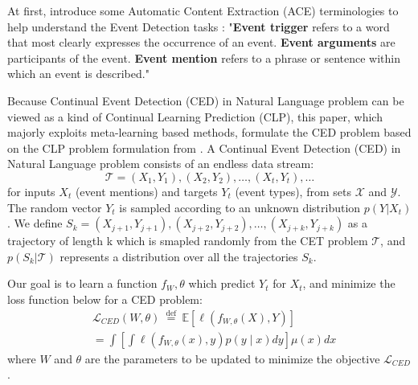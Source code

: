 At first, introduce some Automatic Content Extraction (ACE) terminologies to help understand the Event Detection tasks \citep{cao2020incremental}: "\textbf{Event trigger} refers to a word that most clearly expresses the occurrence of an event. \textbf{Event arguments} are participants of the event. \textbf{Event mention} refers to a phrase or sentence within which an event is described."

Because Continual Event Detection (CED) in Natural Language problem can be viewed as a kind of Continual Learning Prediction (CLP), this paper, which majorly exploits meta-learning based methods, formulate the CED problem based on the CLP problem formulation from \citet{javed2019meta}.
A Continual Event Detection (CED) in Natural Language problem consists of an endless data stream:
\[\mathcal{T} = (X_1, Y_1), (X_2, Y_2), \dots, (X_t, Y_t), \dots\]
for inputs $X_t$ (event mentions) and targets $Y_t$ (event types), from sets $\mathcal{X}$ and $\mathcal{Y}$. The random vector $Y_t$ is sampled
according to an unknown distribution $p(Y|X_t)$. We define $S_k = (X_{j+1}, Y_{j+1}), (X_{j+2}, Y_{j+2}), \dots, (X_{j+k}, Y_{j+k})$ as a trajectory of length k which is smapled randomly from the CET problem $\mathcal{T}$, and $p(S_k|\mathcal{T})$ represents a distribution over all the trajectories $S_k$.

Our goal is to learn a function $f_W,\theta$ which predict $Y_t$ for $X_t$, and minimize the loss function below for a CED problem:
\begin{equation}
    \begin{split}
    &\mathcal{L}_{C E D}(W, \theta) \stackrel{\text { def }}{=}  \mathbb{E}\left[\ell\left(f_{W, \theta}(X), Y\right)\right] \\ 
    & =\int\left[\int \ell\left(f_{W, \theta}(x), y\right) p(y \mid x) d y\right] \mu(x) d x
    \end{split}
\end{equation}
where $W$ and $\theta$ are the parameters to be updated to minimize the objective $\mathcal{L}_{C E D}$.
